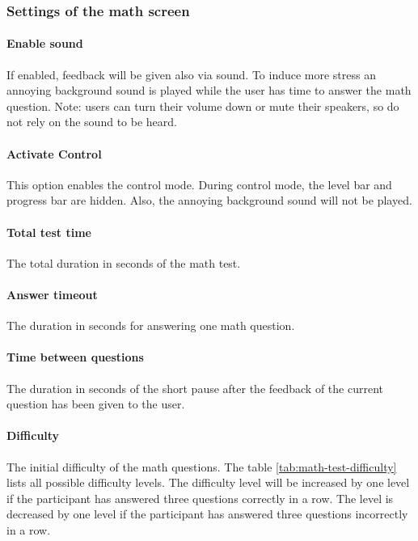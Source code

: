 \subsubsection*{Settings of the math screen}

\paragraph{Enable sound}
If enabled, feedback will be given also via sound. 
To induce more stress an annoying background sound is played while the user has time to answer the math question.
Note: users can turn their volume down or mute their speakers, so do not rely on the sound to be heard.

\paragraph{Activate Control}
This option enables the control mode.
During control mode, the level bar and progress bar are hidden.
Also, the annoying background sound will not be played.

\paragraph{Total test time}
The total duration in seconds of the math test.

\paragraph{Answer timeout}
The duration in seconds for answering one math question.

\paragraph{Time between questions}
The duration in seconds of the short pause after the feedback of the current question has been given to the user.

\paragraph{Difficulty}
The initial difficulty of the math questions.
The table \ref{tab:math-test-difficulty} lists all possible difficulty levels.
The difficulty level will be increased by one level if the participant has answered three questions correctly in a row.
The level is decreased by one level if the participant has answered three questions incorrectly in a row.

